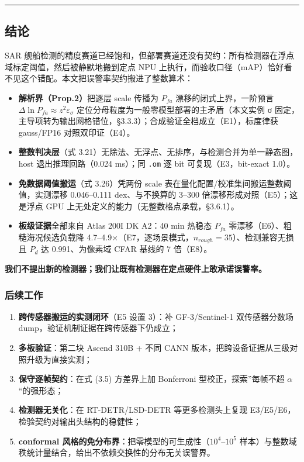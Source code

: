 \begin{center}\rule{0.5\linewidth}{0.5pt}\end{center}

\subsection{结论}\label{ux7ed3ux8bba}

SAR
舰船检测的精度赛道已经饱和，但部署赛道还没有契约：所有检测器在浮点域标定阈值，然后被静默地搬到定点
NPU
上执行，而验收口径（mAP）恰好看不见这个错配。本文把误警率契约搬进了整数算术：

\begin{itemize}
\tightlist
\item
  \textbf{解析界（Prop.2）}把逐层 scale 传播为 \(P_{fa}\)
  漂移的闭式上界，一阶预言
  \(\Delta\ln P_{fa}\approx z^2\varepsilon_\sigma\)
  定位分母粒度为一般零模型部署的主矛盾（本文实例 σ
  固定，主导项转为输出网格错位，§3.3.3）；合成验证全档成立（E1），标度律获
  gauss/FP16 对照双印证（E4）。
\item
  \textbf{整数判决层}（式
  3.21）无除法、无浮点、无排序，与检测合并为单一静态图，host
  退出推理回路（0.024 ms）；同 \texttt{.om} 逐 bit 可复现（E3，bit-exact
  1.0）。
\item
  \textbf{免数据阈值搬运}（式 3.26）凭两份 scale
  表在量化配置/校准集间搬运整数阈值，实测漂移 0.046--0.111
  dex、与不换算的 3--300 倍漂移形成对照（E5）；这是浮点 GPU
  上无处定义的能力（无整数格点承载，§3.6.1）。
\item
  \textbf{板级证据}全部来自 Atlas 200I DK A2：40 min 热稳态 \(P_{fa}\)
  零漂移（E6）、粗糙海况候选负载降
  4.7--4.9×（E7，逐场景模式，\(n_{rough}=35\)）、检测兼容无损且 \(P_d\)
  达 0.991、为像素域 CFAR 基线的 7 倍（E8）。
\end{itemize}

\textbf{我们不提出新的检测器；我们让既有检测器在定点硬件上敢承诺误警率。}

\subsubsection{后续工作}\label{ux540eux7eedux5de5ux4f5c}

\begin{enumerate}
\def\labelenumi{\arabic{enumi}.}
\tightlist
\item
  \textbf{跨传感器搬运的实测闭环}（E5 设置 3）：补 GF-3/Sentinel-1
  双传感器分数场 dump，验证机制证据在跨传感器下仍成立；
\item
  \textbf{多板验证}：第二块 Ascend 310B + 不同 CANN
  版本，把跨设备证据从三级对照升级为直接实测；
\item
  \textbf{保守逐帧契约}：在式 (3.5) 方差界上加 Bonferroni
  型校正，探索''每帧不超 \(\alpha\)``的强形态；
\item
  \textbf{检测器无关化}：在 RT-DETR/LSD-DETR 等更多检测头上复现
  E3/E5/E6，检验契约对输出头结构的稳健性；
\item
  \textbf{conformal
  风格的免分布界}：把零模型的可生成性（\(10^4\)--\(10^5\)
  样本）与整数域秩统计量结合，给出不依赖交换性的分布无关误警界。
\end{enumerate}

